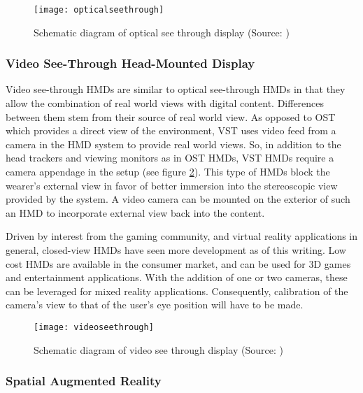 \begin{figure}
	\centering
	\texttt{[image: opticalseethrough]}
	\caption{Schematic diagram of optical see through display (Source: \cite{azuma1997survey})}
	\label{fig:opticalseethrough}
\end{figure}

\subsubsection{Video See-Through Head-Mounted Display}
Video see-through HMDs are similar to optical see-through HMDs in that they allow the combination of real world views with digital content. Differences between them stem from their source of real world view. As opposed to OST which provides a direct view of the environment, VST uses video feed from a camera in the HMD system to provide real world views. So, in addition to the head trackers and viewing monitors as in OST HMDs, VST HMDs require a camera appendage in the setup (see figure \ref{fig:videoseethrough}). This type of HMDs block the wearer's external view in favor of better immersion into the stereoscopic view provided by the system. A video camera can be mounted on the exterior of such an HMD to incorporate external view back into the content.

Driven by interest from the gaming community, and virtual reality applications in general, closed-view HMDs have seen more development as of this writing. Low cost HMDs are available in the consumer market, and can be used for 3D games and entertainment applications. With the addition of one or two cameras, these can be leveraged for mixed reality applications. Consequently, calibration of the camera's view to that of the user's eye position will have to be made.

\begin{figure}
	\centering
	\texttt{[image: videoseethrough]}
	\caption{Schematic diagram of video see through display (Source: \cite{azuma1997survey})}
	\label{fig:videoseethrough}
\end{figure}



\subsubsection{Spatial Augmented Reality}

